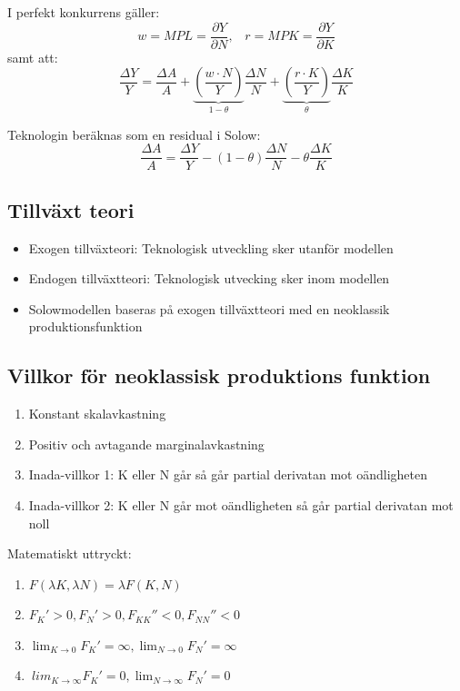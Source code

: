 \documentclass[12pt,a4paper]{article}
\begin{document}
\noindent I perfekt konkurrens gäller:
$$w = MPL = \frac{\partial Y}{\partial N}, \hspace{10pt} r = MPK = \frac{\partial Y}{\partial K}$$
samt att:
$$\frac{\Delta Y}{Y} = \frac{\Delta A}{A} + \underbrace{(\frac{w \cdot N}{Y})}_{1-\theta}\frac{\Delta N}{N} + \underbrace{(\frac{r \cdot K}{Y})}_{\theta}\frac{\Delta K}{K}$$

\noindent Teknologin beräknas som en residual i Solow:
$$\frac{\Delta A}{A} = \frac{\Delta Y}{Y} - (1-\theta)\frac{\Delta N}{N} - \theta \frac{\Delta K}{K}$$

\subsection*{Tillväxt teori}
\begin{itemize}
    \item Exogen tillväxteori: Teknologisk utveckling sker utanför modellen
    \item Endogen tillväxtteori: Teknologisk utvecking sker inom modellen
    \item Solowmodellen baseras på exogen tillväxtteori med en neoklassik produktionsfunktion
\end{itemize}

\subsection*{Villkor för neoklassisk produktions funktion}
\begin{enumerate}
    \item Konstant skalavkastning
    \item Positiv och avtagande marginalavkastning
    \item Inada-villkor 1: K eller N går så går partial derivatan mot oändligheten
    \item Inada-villkor 2: K eller N går mot oändligheten så går partial derivatan mot noll
\end{enumerate}

\noindent Matematiskt uttryckt:
\begin{enumerate}
    \item $F(\lambda K, \lambda N) = \lambda F(K, N)$
    \item $F_K' > 0, F_N' > 0, F_{KK}'' < 0, F_{NN}'' < 0$
    \item $\lim_{K \to 0} F_K' = \infty, \lim_{N \to 0} F_N' = \infty$
    \item $\
    lim_{K \to \infty} F_K' = 0, \lim_{N \to \infty} F_N' = 0$
\end{enumerate}
\end{document}
